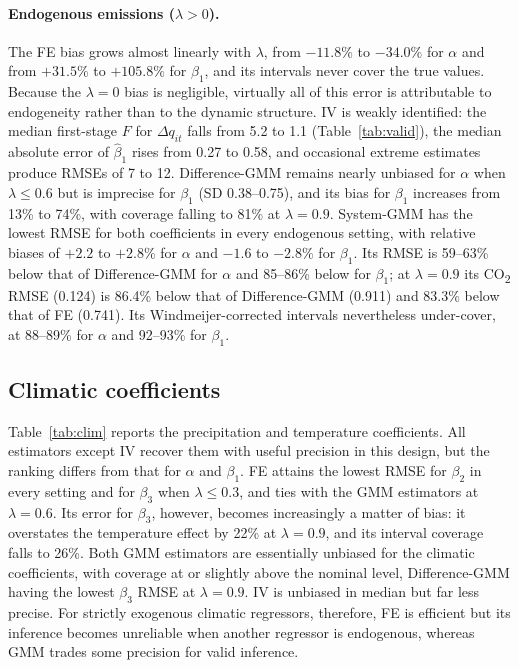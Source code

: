 \documentclass[11pt,a4paper]{article}
\newcommand{\COtwo}{CO\textsubscript{2}}
\begin{document}
\paragraph{Endogenous emissions ($\lambda>0$).} The FE bias grows almost linearly with $\lambda$, from $-11.8\%$ to $-34.0\%$ for $\alpha$ and from $+31.5\%$ to $+105.8\%$ for $\beta_1$, and its intervals never cover the true values. Because the $\lambda=0$ bias is negligible, virtually all of this error is attributable to endogeneity rather than to the dynamic structure. IV is weakly identified: the median first-stage $F$ for $\Delta q_{it}$ falls from 5.2 to 1.1 (Table~\ref{tab:valid}), the median absolute error of $\hat\beta_1$ rises from 0.27 to 0.58, and occasional extreme estimates produce RMSEs of 7 to 12. Difference-GMM remains nearly unbiased for $\alpha$ when $\lambda\le0.6$ but is imprecise for $\beta_1$ (SD 0.38--0.75), and its bias for $\beta_1$ increases from 13\% to 74\%, with coverage falling to 81\% at $\lambda=0.9$. System-GMM has the lowest RMSE for both coefficients in every endogenous setting, with relative biases of $+2.2$ to $+2.8\%$ for $\alpha$ and $-1.6$ to $-2.8\%$ for $\beta_1$. Its RMSE is 59--63\% below that of Difference-GMM for $\alpha$ and 85--86\% below for $\beta_1$; at $\lambda=0.9$ its \COtwo{} RMSE (0.124) is 86.4\% below that of Difference-GMM (0.911) and 83.3\% below that of FE (0.741). Its Windmeijer-corrected intervals nevertheless under-cover, at 88--89\% for $\alpha$ and 92--93\% for $\beta_1$.

\subsection{Climatic coefficients}\label{sec:clim}

Table~\ref{tab:clim} reports the precipitation and temperature coefficients. All estimators except IV recover them with useful precision in this design, but the ranking differs from that for $\alpha$ and $\beta_1$. FE attains the lowest RMSE for $\beta_2$ in every setting and for $\beta_3$ when $\lambda\le0.3$, and ties with the GMM estimators at $\lambda=0.6$. Its error for $\beta_3$, however, becomes increasingly a matter of bias: it overstates the temperature effect by 22\% at $\lambda=0.9$, and its interval coverage falls to 26\%. Both GMM estimators are essentially unbiased for the climatic coefficients, with coverage at or slightly above the nominal level, Difference-GMM having the lowest $\beta_3$ RMSE at $\lambda=0.9$. IV is unbiased in median but far less precise. For strictly exogenous climatic regressors, therefore, FE is efficient but its inference becomes unreliable when another regressor is endogenous, whereas GMM trades some precision for valid inference.
\end{document}
